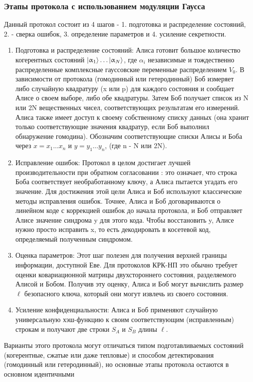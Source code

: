 \subsubsection{Этапы протокола с использованием модуляции Гаусса}
Данный протокол состоит из 4 шагов - 1. подготовка и распределение состояний, 2. - сверка ошибок, 3. определение параметров и 4. усиление секретности. 
\begin{enumerate}
    \item Подготовка и распределение состояний: Алиса готовит большое количество когерентных состояний $\lvert\upalpha_1\rangle \dots \lvert\upalpha_N\rangle $, где $\alpha_i$ независимые и тождественно распределенные комплексные гауссовские переменные распределением $V_0$. В зависимости от протокола (гомодинный или гетеродинный) Боб измеряет либо случайную квадратуру (x или p) для каждого состояния и сообщает Алисе о своем выборе, либо обе квадратуры. Затем Боб получает список из N или 2N вещественных чисел, соответствующих результатам его измерений. Алиса также имеет доступ к своему собственному списку данных (она хранит только соответствующие значения квадратур, если Боб выполнил обнаружение гомодина). Обозначим соответствующие списки Алисы и Боба через  $x = {x_1 \dots x_n}$ и $y = {y_1 \dots y_n}$, (где n - N или 2N).
    \item Исправление ошибок: Протокол в целом достигает лучшей производительности при обратном согласовании : это означает, что строка Боба соответствует необработанному ключу, а Алиса пытается угадать его значение. Для достижения этой цели Алиса и Боб используют классические методы исправления ошибок. Точнее, Алиса и Боб договариваются о линейном коде с коррекцией ошибок до начала протокола, и Боб отправляет Алисе значение синдрома y для этого кода. Чтобы восстановить y, Алисе нужно просто исправить x, то есть декодировать в косетевой код, определяемый полученным синдромом. 
    \item Оценка параметров: Этот шаг полезен для получения верхней границы информации, доступной Еве. Для протоколов КРК-НП это обычно требует оценки ковариационной матрицы двухстороннего состояния, разделяемого Алисой и Бобом. Получив эту оценку, Алиса и Боб могут вычислить размер $\ell$ безопасного ключа, который они могут извлечь из своего состояния.
    \item Усиление конфиденциальности: Алиса и Боб применяют случайную универсальную хэш-функцию к своим соответствующим (исправленным) строкам и получают две строки $S_A$  и $S_B$ длины $\ell$.
\end{enumerate}
Варианты этого протокола могут отличаться типом подготавливаемых состояний (когерентные, сжатые или даже тепловые) и способом детектирования (гомодинный или гетеродинный), но основные этапы протокола остаются в основном идентичными

